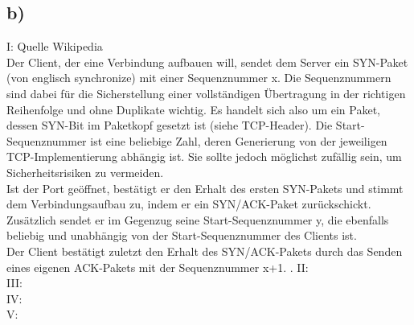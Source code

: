 \documentclass{article}
\begin{document}
	\subsection*{b)}
	I: Quelle Wikipedia \\
	Der Client, der eine Verbindung aufbauen will, sendet dem Server ein SYN-Paket (von englisch synchronize) mit einer Sequenznummer x. Die Sequenznummern sind dabei für die Sicherstellung einer vollständigen Übertragung in der richtigen Reihenfolge und ohne Duplikate wichtig. Es handelt sich also um ein Paket, dessen SYN-Bit im Paketkopf gesetzt ist (siehe TCP-Header). Die Start-Sequenznummer ist eine beliebige Zahl, deren Generierung von der jeweiligen TCP-Implementierung abhängig ist. Sie sollte jedoch möglichst zufällig sein, um Sicherheitsrisiken zu vermeiden. \\
	Ist der Port geöffnet, bestätigt er den Erhalt des ersten SYN-Pakets und stimmt dem Verbindungsaufbau zu, indem er ein SYN/ACK-Paket zurückschickt. Zusätzlich sendet er im Gegenzug seine Start-Sequenznummer y, die ebenfalls beliebig und unabhängig von der Start-Sequenznummer des Clients ist. \\
	Der Client bestätigt zuletzt den Erhalt des SYN/ACK-Pakets durch das Senden eines eigenen ACK-Pakets mit der Sequenznummer x+1. .
	II:  \\
	III: \\
	IV: \\
	V: \\
\end{document}

